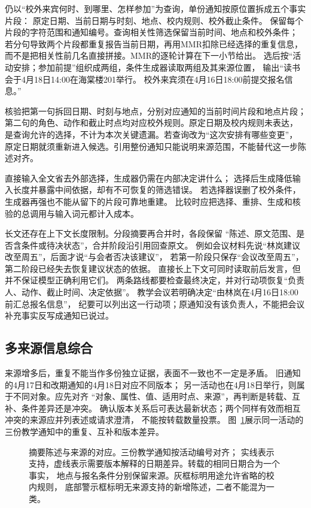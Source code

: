 仍以“校外来宾何时、到哪里、怎样参加”为查询，单份通知按原位置拆成五个事实片段：
原定日期、当前日期与时刻、地点、校内规则、校外截止条件。
保留每个片段的字符范围和通知编号。查询相关性筛选保留当前时间、地点和校外条件；
若分句导致两个片段都重复报告当前日期，再用MMR扣除已经选择的重复信息，
而不是把相关性前几名直接拼接。MMR的逐轮计算在下一小节给出。
选后按“活动安排；参加前提”组织成两组，条件生成器读取两组及其来源位置，
输出“读书会于4月18日14:00在海棠楼201举行。
校外来宾须在4月16日18:00前提交报名信息。”

核验把第一句拆回日期、时刻与地点，分别对应通知的当前时间片段和地点片段；
第二句的角色、动作和截止时点均对应校外规则。原定日期及校内规则未表达，
是查询允许的选择，不计为本次关键遗漏。若查询改为“这次安排有哪些变更”，
原定日期就须重新进入候选。引用整份通知只能说明来源范围，不能替代这一步陈述对齐。

直接输入全文省去外部选择，生成器仍需在内部决定讲什么；
选择后生成降低输入长度并暴露中间依据，却有不可恢复的筛选错误。
若选择器误删了校外条件，生成器再强也不能从留下的片段可靠地重建。
比较时应把选择、重排、生成和核验的总调用与输入词元都计入成本。

长文还存在上下文长度限制。分段摘要再合并时，各段保留
“陈述、原文范围、是否含条件或待决状态”，合并阶段沿引用回查原文。
例如会议材料先说“林岚建议改至周五”，后面才说“与会者否决该建议”，
若第一阶段只保存“会议改至周五”，第二阶段已经失去恢复建议状态的依据。
直接长上下文可同时读取前后发言，但并不保证模型正确利用它们。
两条路线都要检查最终决定，并对行动项恢复“负责人、动作、截止时间、决定依据”。
教学会议若明确决定“由林岚在4月16日18:00前汇总报名信息”，
纪要可以列出这一行动项；原通知没有该负责人，不能把会议补充事实反写成通知已说过。

\subsection{多来源信息综合}
\label{sec:nlp-generation-multi-summary}

来源增多后，重复不能当作多份独立证据，表面不一致也不一定是矛盾。
旧通知的4月17日和改期通知的4月18日对应不同版本；
另一活动也在4月18日举行，则属于不同对象。应先对齐
“对象、属性、值、适用时点、来源”，再判断是转载、互补、条件差异还是冲突。
确认版本关系后可表达最新状态；两个同样有效而相互冲突的来源应并列表述或请求澄清，
不能按转载数量投票。
图~\ref{fig:nlp-generation-provenance}展示同一活动的三份教学通知中的重复、互补和版本差异。

\begin{figure}[htbp]
  \centering
  
  \caption{摘要陈述与来源的对应。三份教学通知按活动编号对齐；
  实线表示支持，虚线表示需要版本解释的日期差异。转载的相同日期合为一个事实，
  地点与报名条件分别保留来源。灰框标明用途允许省略的校内规则，
  底部警示框标明无来源支持的新增陈述，二者不能混为一类。}
  \label{fig:nlp-generation-provenance}
\end{figure}
\FloatBarrier

